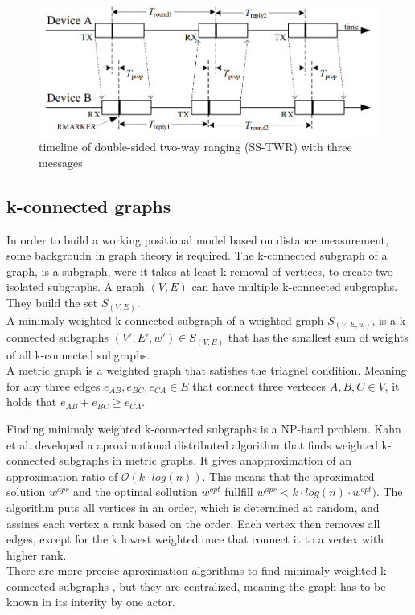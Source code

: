 \begin{figure}[ht!]
\centering
\includegraphics[width=\linewidth]{graphics/schematics/TwoSidedRangingThreeMessages.PNG}
\caption{timeline of double-sided two-way ranging (SS-TWR) with three messages\cite{IEEE4z}}
\label{f:ds_twr_3}
\end{figure}


\subsection{k-connected graphs}
\label{ss:k_connected_explained}
In order to build a working positional model based on distance measurement, some backgroudn in graph theory is required.
The k-connected subgraph of a graph, is a subgraph, were it takes at least k removal of vertices, to create two isolated subgraphs.
A graph $(V,E)$ can have multiple k-connected subgraphs.
They build the set $S_{(V,E)}$.\\
A minimaly weighted k-connected subgraph of a weighted graph $S_{(V,E,w)}$, is a k-connected subgraphs $(V',E',w') \in S_{(V,E)}$ that has the smallest sum of weights of all k-connected subgraphs.\\
A metric graph is a weighted graph that satisfies the triagnel condition.
Meaning for any three edges $e_{AB},e_{BC},e_{CA} \in E$  that connect three verteces $A, B, C \in V$, it holds that $e_{AB} + e_{BC} \geq e_{CA}$.


Finding minimaly weighted k-connected subgraphs is a NP-hard problem.
Kahn et al. \cite{khan2007simple} developed a aproximational distributed algorithm that finds weighted k-connected subgraphs in metric graphs.
It gives anapproximation of an approximation ratio of $\mathcal{O}(k\cdot log(n))$.
This means that the aproximated solution $w^{apr}$ and the optimal sollution $w^{opt}$ fullfill $w^{apr} < k\cdot log(n)\cdot w^{opt})$.
The algorithm puts all vertices in an order, which is determined at random, and assines each vertex a rank based on the order.
Each vertex then removes all edges, except for the k lowest weighted once that connect it to a vertex with higher rank.\\
There are more precise aproximation algorithms to find minimaly weighted k-connected subgraphs \cite{kortsarz2003approximating, kortsarz2004approximation}, but they are centralized, meaning the graph has to be known in its interity by one actor.


